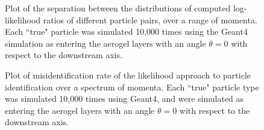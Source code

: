 \begin{figure}[]
\centering
{}
\caption[Plot of the separation between the distributions of computed log-likelihood ratios of different particle pairs, over a range of momenta. ]{Plot of the separation between the distributions of computed log-likelihood ratios of different particle pairs, over a range of momenta. Each ``true" particle was simulated 10,000 times using the Geant4 simulation as entering the aerogel layers with an angle $\theta = 0$ with respect to the downstream axis.}
\label{fig:centeredSeps} 
\end{figure}

\begin{figure}[]
\centering
{}
\caption[Plot of misidentification rate of the likelihood approach to particle identification over a spectrum of momenta.]{Plot of misidentification rate of the likelihood approach to particle identification over a spectrum of momenta. Each ``true" particle type was simulated 10,000 times using Geant4, and were simulated as entering the aerogel layers with an angle $\theta = 0$ with respect to the downstream axis.}
\label{fig:centeredMis} 
\end{figure}

